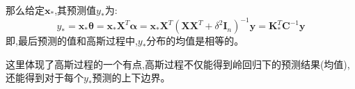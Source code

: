 \documentclass[UTF8,a4paper]{ctexart}
\begin{document}
        那么给定$\bm x_*$,其预测值$y_*$为:
        \begin{equation}
            y_* = \bm x_*\bm \theta = \bm x_* \bm X^T\bm \alpha = \bm x_*\bm X^T(\bm X\bm X^T + \delta^2 \bm I_n)^{-1}\bm y
                    = \bm K_*^T\bm C^{-1}\bm y
        \end{equation}
        即,最后预测的值和高斯过程中,$y_*$分布的均值是相等的。

        {\color{blue}这里体现了高斯过程的一个有点,高斯过程不仅能得到岭回归下的预测结果(均值),还能得到对于每个$y_*$预测的上下边界。}
\end{document}
